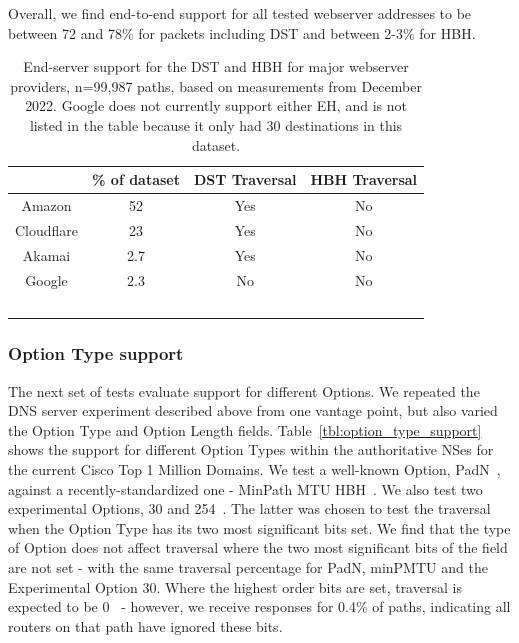 \documentclass[conference]{IEEEtran}
\begin{document}
Overall, we find end-to-end support for all tested webserver addresses to be between 72 and 78\% for  packets including DST and between 2-3\% for HBH.


\begin{table} 
\begin{tabular}{c|c|c|c}
           & \% of dataset & DST Traversal & HBH Traversal\\
\hline
Amazon & 52                      & Yes                & No                 \\
\hline
Cloudflare     & 23                     & Yes                 & No                 \\
\hline
Akamai    & 2.7                     & Yes                & No                 \\
\hline
Google      & 2.3                     & No                 & No                 \\
\
\end{tabular}
\label{tbl:web_provider_support}
\caption{End-server support for the DST and HBH for major webserver providers, n=99,987 paths, based on measurements from December 2022. Google does not currently support either EH, and is not listed in the table because it only had 30 destinations in this dataset.
}
\end{table}


\subsubsection{Option Type support}

The next set of tests evaluate support for different Options. We repeated the DNS server experiment described above from one vantage point, but also varied the Option Type and Option Length fields. 
Table~\ref{tbl:option_type_support} shows the support for different Option Types within the authoritative NSes for the current Cisco Top 1 Million Domains. We test a well-known Option, PadN~\cite{rfc2460}, against a recently-standardized one - MinPath MTU HBH~\cite{rfc9268}. We also test two experimental Options, 30 and 254~\cite{RFC4727}. The latter was chosen to test the traversal when the Option Type has its two most significant bits set.
We find that the type of Option  does not affect traversal where the two most significant bits of the field are not set - with the same traversal percentage for PadN, minPMTU and the Experimental Option 30. Where the highest order bits are set, traversal is expected to be 0~\cite{RFC8200} - however, we  receive responses for 0.4\% of paths, indicating all routers on that path have ignored these bits.
\end{document}
